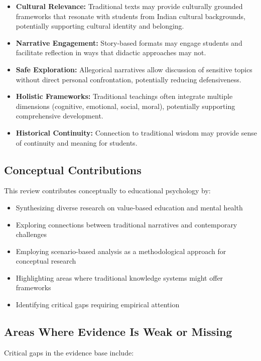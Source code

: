 \documentclass[12pt,a4paper,twocolumn]{article}
\begin{document}
\begin{itemize}
    \item \textbf{Cultural Relevance:} Traditional texts may provide culturally grounded frameworks that resonate with students from Indian cultural backgrounds, potentially supporting cultural identity and belonging.
    \item \textbf{Narrative Engagement:} Story-based formats may engage students and facilitate reflection in ways that didactic approaches may not.
    \item \textbf{Safe Exploration:} Allegorical narratives allow discussion of sensitive topics without direct personal confrontation, potentially reducing defensiveness.
    \item \textbf{Holistic Frameworks:} Traditional teachings often integrate multiple dimensions (cognitive, emotional, social, moral), potentially supporting comprehensive development.
    \item \textbf{Historical Continuity:} Connection to traditional wisdom may provide sense of continuity and meaning for students.
\end{itemize}

\subsection{Conceptual Contributions}

This review contributes conceptually to educational psychology by:

\begin{itemize}
    \item Synthesizing diverse research on value-based education and mental health
    \item Exploring connections between traditional narratives and contemporary challenges
    \item Employing scenario-based analysis as a methodological approach for conceptual research
    \item Highlighting areas where traditional knowledge systems might offer frameworks
    \item Identifying critical gaps requiring empirical attention
\end{itemize}

\subsection{Areas Where Evidence Is Weak or Missing}

Critical gaps in the evidence base include:
\end{document}
